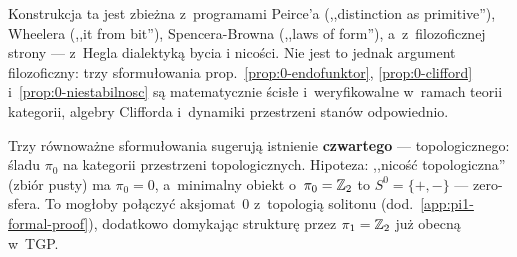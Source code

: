 \begin{remark}\label{rem:0-filozofia}
Konstrukcja ta jest zbie\.zna z~programami Peirce'a (,,distinction
as primitive''), Wheelera (,,it from bit''), Spencera-Browna
(,,laws of form''), a~z~filozoficznej strony --- z~Hegla
dialektyk\k{a} bycia i nicości. Nie jest to jednak argument
filozoficzny: trzy sformu\l{}owania prop.~\ref{prop:0-endofunktor},
\ref{prop:0-clifford} i~\ref{prop:0-niestabilnosc} s\k{a}
matematycznie \'scis\l{}e i~weryfikowalne w~ramach teorii kategorii,
algebry Clifforda i~dynamiki przestrzeni stan\'ow odpowiednio.
\end{remark}

\begin{observation}%
\label{obs:0-linia}
Trzy r\'ownowa\.zne sformu\l{}owania sugeruj\k{a} istnienie
\textbf{czwartego} --- topologicznego: \'sladu $\pi_0$ na kategorii
przestrzeni topologicznych. Hipoteza: ,,nicość topologiczna'' (zbi\'or
pusty) ma $\pi_0 = 0$, a~minimalny obiekt o~$\pi_0 = \mathbb{Z}_2$ to
$S^0 = \{+, -\}$ --- zero-sfera. To mog\l{}oby po\l{}\k{a}czy\'c
aksjomat~0 z~topologi\k{a} solitonu (dod.~\ref{app:pi1-formal-proof}),
dodatkowo domykaj\k{a}c struktur\k{e} przez $\pi_1 = \mathbb{Z}_2$ ju\.z
obecn\k{a} w~TGP.
\end{observation}

